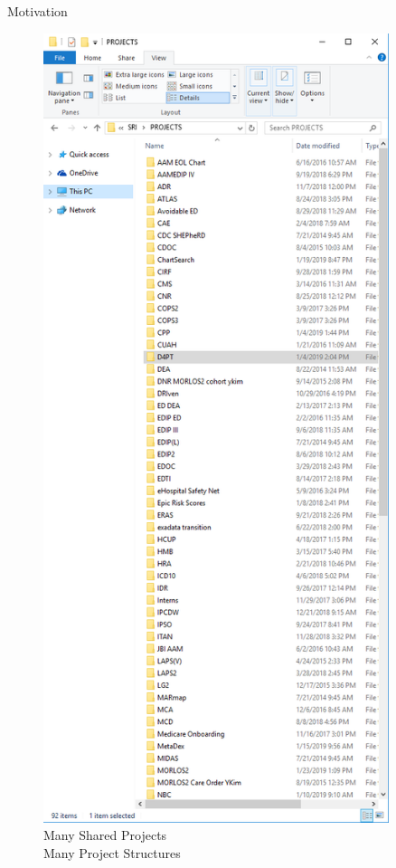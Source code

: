 \documentclass{beamer}
\begin{document}
\begin{frame}{Motivation}
\begin{minipage}{0.6\textwidth}
\end{minipage}
\begin{minipage}{0.3\textwidth}
\begin{figure}
\includegraphics[width=0.9\textwidth]{./PROJECT_FOLDERS.PNG}
\caption*{ Many Shared Projects\\ Many Project Structures}
\end{figure}

\end{minipage}


\end{frame}
\end{document}
